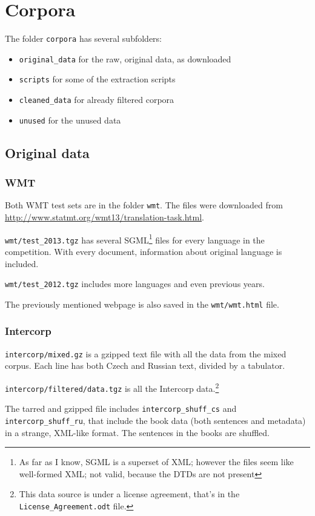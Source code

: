 \section{Corpora}
The folder \texttt{corpora} has several subfolders:
\begin{itemize}
\item \texttt{original\_data} for the raw, original data, as downloaded
\item \texttt{scripts} for some of the extraction scripts
\item \texttt{cleaned\_data} for already filtered corpora
\item \texttt{unused} for the unused data
\end{itemize}

\subsection{Original data}
\subsubsection{WMT}
Both WMT test sets are in the folder \texttt{wmt}. The files were downloaded from \url{http://www.statmt.org/wmt13/translation-task.html}.

\texttt{wmt/test\_2013.tgz} has several SGML\footnote{As far as I know, SGML is a superset of XML; however the files seem like well-formed XML; not valid, because the DTDs are not present} files for every language in the competition. With every document, information about original language is included.

\texttt{wmt/test\_2012.tgz} includes more languages and even previous years.

The previously mentioned webpage is also saved in the \texttt{wmt/wmt.html} file.
\subsubsection{Intercorp}
\texttt{intercorp/mixed.gz} is a gzipped text file with all the data from the mixed corpus. Each line has both Czech and Russian text, divided by a tabulator.

\texttt{intercorp/filtered/data.tgz} is all the Intercorp data.\footnote{This data source is under a license agreement, that's in the \texttt{License\_Agreement.odt} file.}

The tarred and gzipped file includes \texttt{intercorp\_shuff\_cs} and \texttt{intercorp\allowbreak \_shuff\allowbreak \_ru}, that include the book data (both sentences and metadata) in a strange, XML-like format. The sentences in the books are shuffled.

